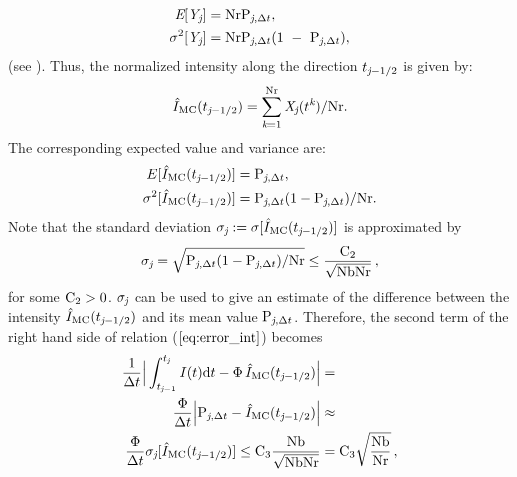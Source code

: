 \begin{subequations}
\begin{align}
\textit{E}[\textit{Y}_{\textit{j}}] &= \textrm{Nr}\textrm{P}_{\textit{j}, \Delta t}, \\ \sigma^2[\textit{Y}_{\textit{j}}] &= \textrm{Nr}\textrm{P}_{\textit{j}, \Delta t}(1~-~\textrm{P}_{\textit{j}, \Delta t}),\end{align}
\end{subequations}
(see \cite{zolotarev1997modern, rubinstein2016simulation}).
Thus, the normalized intensity along the direction $t_{\textit{j}-1/2}$ is given by:
\begin{equation}\hat{I}_{\textrm{MC}}(t_{\textit{j}-1/2}) = \sum_{\textit{k}=1}^{\textrm{Nr}}\textit{X}_{\textit{j}}(t^{\textit{k}})/\textrm{Nr}.\end{equation}
The corresponding expected value and variance are:
\begin{subequations}
\begin{align}E[\hat{I}_{\textrm{MC}}(t_{\textit{j}-1/2})]&=\textrm{P}_{\textit{j}, \Delta t},\\ \label{eq:variance_I}
\sigma^2[\hat{I}_{\textrm{MC}}(t_{\textit{j}-1/2})] &= \textrm{P}_{\textit{j}, \Delta t}(1-\textrm{P}_{\textit{j}, \Delta t})/\textrm{Nr}.
\end{align}
\end{subequations}
Note that the standard deviation $\sigma_{\textit{j}}:=\sigma[\hat{I}_{\textrm{MC}}(t_{\textit{j}-1/2})]$ is approximated by
\begin{equation}\label{sigma}
\sigma_{\textit{j}}= \sqrt{\textrm{P}_{\textit{j}, \Delta t}(1-\textrm{P}_{\textit{j}, \Delta t})/\textrm{Nr}}\leq\frac{\textrm{C}_2}{\sqrt{\textrm{Nb}\textrm{Nr}}}\,, \end{equation}
 for some $\textrm{C}_{2}>0$. $\sigma_{\textit{j}}$ can be used to give an estimate of the difference between the intensity $\hat{I}_{\textrm{MC}}(t_{\textit{j}-1/2})$ and its mean value $\textrm{P}_{\textit{j}, \Delta t}$.
Therefore, the second term of the right hand side of relation ($\ref{eq:error_int}$) becomes
\begin{equation}\begin{aligned}
\frac{1}{\Delta t}\Big|\int_{t_{\textit{j}-1}}^{t_{\textit{j}}} I(t)\textrm{d}t -
\Phi\, \hat{I}_{\textrm{MC}}(t_{\textit{j}-1/2})\Big| &=  \\
\frac{\Phi}{\Delta t}\Big|\textrm{P}_{\textit{j}, \Delta t} -\hat{I}_{\textrm{MC}}(t_{\textit{j}-1/2})\Big| &\approx  \\
  \frac{\Phi}{\Delta t}
\sigma_{\textit{j}}[\hat{I}_{\textrm{MC}}(t_{\textit{j}-1/2})]\leq\textrm{C}_3\frac{\textrm{Nb}}{\sqrt{\textrm{Nb}\textrm{Nr}}} & = \textrm{C}_3\sqrt{\frac{\textrm{Nb}}{\textrm{Nr}}}\,,
\end{aligned}
\end{equation}
